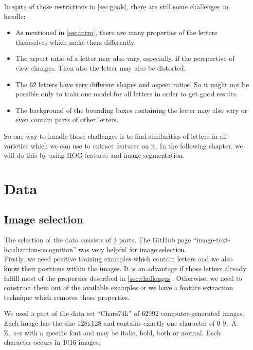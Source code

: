 \documentclass[conference]{IEEEtran}
\begin{document}
In spite of those restrictions in \ref{sec:goals}, there are still some challenges to handle:
\begin{itemize}
\item As mentioned in \ref{sec:intro}, there are many properties of the letters themselves which make them differently.
\item The aspect ratio of a letter may also vary, especially, if the perspective of view changes. Then also the letter may also be distorted.
\item The 62 letters have very different shapes and aspect ratios. So it might not be possible only to train one model for all letters in order to get good results.
\item The background of the bounding boxes containing the letter may also vary or even contain parts of other letters.
\end{itemize}
So one way to handle those challenges is to find similarities of letters in all varieties which we can use to extract features on it. In the following chapter, we will do this by using HOG features and image segmentation.

\section{Data}

\subsection{Image selection}

The selection of the data consists of 3 parts. The GitHub page ``image-text-localization-recognition'' \cite{bib:github} was very helpful for image selection. \\[-5pt]

Firstly, we need positive training examples which contain letters and we also know their positions within the images. It is an advantage if those letters already fulfill most of the properties described in \ref{sec:challenges}. Otherwise, we need to construct them out of the available examples or we have a feature extraction technique which removes those properties.

We used a part of the data set ``Chars74k'' \cite{bib:chars74k} of 62992 computer-generated images. Each image has the size 128x128 and contains exactly one character of \mbox{0-9, A-Z, a-z} with a specific font and may be italic, bold, both or normal. Each character occurs in 1016 images. \\[-5pt]
\end{document}
